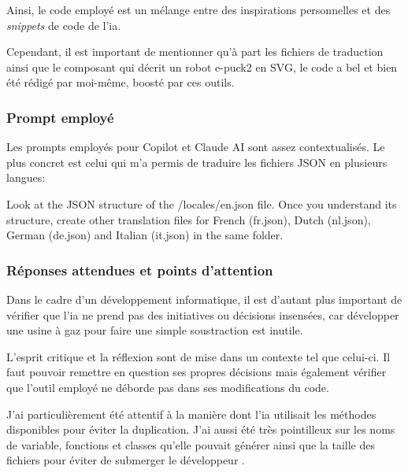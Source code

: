 Ainsi, le code employé est un mélange entre des inspirations personnelles et des \textit{snippets} de code de l'\acrshort{ia}.

Cependant, il est important de mentionner qu'à part les fichiers de traduction ainsi que le composant qui décrit un robot e-puck2 en SVG, le code a bel et bien été rédigé par moi-même, boosté par ces outils.

\subsubsection{Prompt employé}
Les prompts employés pour Copilot et Claude AI sont assez contextualisés.
Le plus concret est celui qui m'a permis de traduire les fichiers JSON en plusieurs langues:
\begin{boxitup}
Look at the JSON structure of the /locales/en.json file.
Once you understand its structure, create other translation files for French (fr.json), Dutch (nl.json), German (de.json) and Italian (it.json) in the same folder.
\end{boxitup}

\subsubsection{Réponses attendues et points d'attention}
Dans le cadre d'un développement informatique, il est d'autant plus important de vérifier que l'\acrshort{ia} ne prend pas des initiatives ou décisions insensées, car développer une usine à gaz pour faire une simple soustraction est inutile.

L'esprit critique et la réflexion sont de mise dans un contexte tel que celui-ci.
Il faut pouvoir remettre en question ses propres décisions mais également vérifier que l'outil employé ne déborde pas dans ses modifications du code.

J'ai particulièrement été attentif à la manière dont l'\acrshort{ia} utilisait les méthodes disponibles pour éviter la duplication.
J'ai aussi été très pointilleux sur les noms de variable, fonctions et classes qu'elle pouvait générer ainsi que la taille des fichiers pour éviter de submerger le développeur \autocites{mark_seemann_fractal_2021}{mark_seemann_code_2021}.
